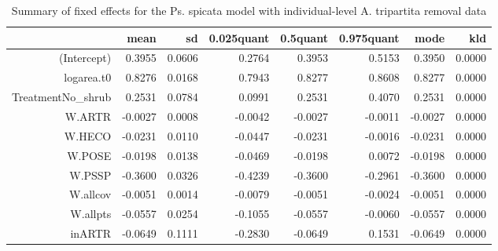 \begin{table}[ht]
\centering
\caption{Summary of fixed effects for the Ps. spicata model with individual-level A. tripartita removal data} 
\label{PSSPgrowth-inARTR}
\begin{tabular}{rrrrrrrr}
  \hline
 & mean & sd & 0.025quant & 0.5quant & 0.975quant & mode & kld \\ 
  \hline
(Intercept) & 0.3955 & 0.0606 & 0.2764 & 0.3953 & 0.5153 & 0.3950 & 0.0000 \\ 
  logarea.t0 & 0.8276 & 0.0168 & 0.7943 & 0.8277 & 0.8608 & 0.8277 & 0.0000 \\ 
  TreatmentNo\_shrub & 0.2531 & 0.0784 & 0.0991 & 0.2531 & 0.4070 & 0.2531 & 0.0000 \\ 
  W.ARTR & -0.0027 & 0.0008 & -0.0042 & -0.0027 & -0.0011 & -0.0027 & 0.0000 \\ 
  W.HECO & -0.0231 & 0.0110 & -0.0447 & -0.0231 & -0.0016 & -0.0231 & 0.0000 \\ 
  W.POSE & -0.0198 & 0.0138 & -0.0469 & -0.0198 & 0.0072 & -0.0198 & 0.0000 \\ 
  W.PSSP & -0.3600 & 0.0326 & -0.4239 & -0.3600 & -0.2961 & -0.3600 & 0.0000 \\ 
  W.allcov & -0.0051 & 0.0014 & -0.0079 & -0.0051 & -0.0024 & -0.0051 & 0.0000 \\ 
  W.allpts & -0.0557 & 0.0254 & -0.1055 & -0.0557 & -0.0060 & -0.0557 & 0.0000 \\ 
  inARTR & -0.0649 & 0.1111 & -0.2830 & -0.0649 & 0.1531 & -0.0649 & 0.0000 \\ 
   \hline
\end{tabular}
\end{table}

